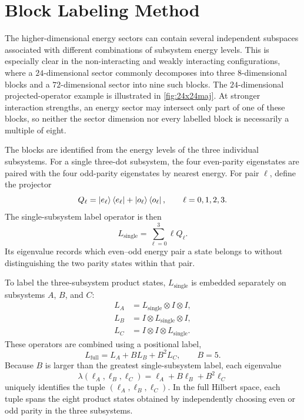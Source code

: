 \chapter{Block Labeling Method}
\label{app:block_label_method}
The higher-dimensional energy sectors can contain several independent
subspaces associated with different combinations of subsystem energy levels.
This is especially clear in the non-interacting and weakly interacting
configurations, where a \(24\)-dimensional sector commonly decomposes into
three \(8\)-dimensional blocks and a \(72\)-dimensional sector into nine such
blocks. The \(24\)-dimensional projected-operator example is illustrated in
\cref{fig:24x24maj}. At stronger interaction strengths, an energy
sector may intersect only part of one of these blocks, so neither the sector
dimension nor every labelled block is necessarily a multiple of eight.



The blocks are identified from the energy levels of the three individual
subsystems. For a single three-dot subsystem, the four even-parity
eigenstates are paired with the four odd-parity eigenstates by nearest energy.
For pair \(\ell\), define the projector
\begin{equation}
  Q_{\ell}
  =
  \ket{e_{\ell}}\bra{e_{\ell}}
  +
  \ket{o_{\ell}}\bra{o_{\ell}},
  \qquad
  \ell=0,1,2,3.
\end{equation}
The single-subsystem label operator is then
\begin{equation}
  L_{\mathrm{single}}
  =
  \sum_{\ell=0}^{3} \ell Q_{\ell}.
\end{equation}
Its eigenvalue records which even--odd energy pair a state belongs to without
distinguishing the two parity states within that pair.

To label the three-subsystem product states, \(L_{\mathrm{single}}\) is
embedded separately on subsystems \(A\), \(B\), and \(C\):
\begin{equation}
  \begin{aligned}
    L_A &= L_{\mathrm{single}}\otimes I\otimes I,\\
    L_B &= I\otimes L_{\mathrm{single}}\otimes I,\\
    L_C &= I\otimes I\otimes L_{\mathrm{single}}.
  \end{aligned}
\end{equation}
These operators are combined using a positional label,
\begin{equation}
  L_{\mathrm{full}}
  =
  L_A + B L_B + B^2 L_C,
  \qquad B=5.
\end{equation}
Because \(B\) is larger than the greatest single-subsystem label, each
eigenvalue
\begin{equation}
  \lambda(\ell_A,\ell_B,\ell_C)
  =
  \ell_A+B\ell_B+B^2\ell_C
\end{equation}
uniquely identifies the tuple \((\ell_A,\ell_B,\ell_C)\). In the full Hilbert
space, each tuple spans the eight product states obtained by independently
choosing even or odd parity in the three subsystems.

